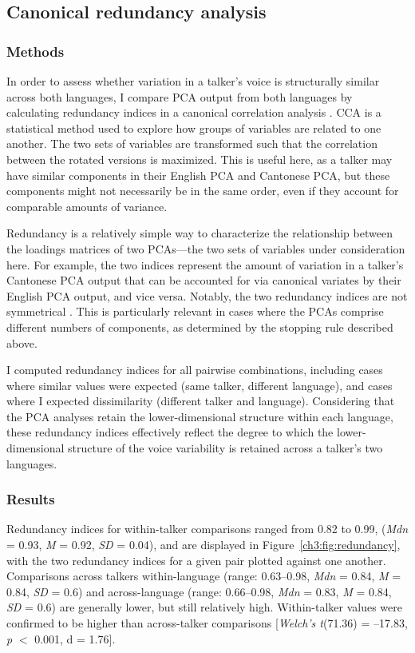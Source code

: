 \subsection{Canonical redundancy analysis}
\subsubsection{Methods}
In order to assess whether variation in a talker's voice is structurally similar across both languages, I compare PCA output from both languages by calculating redundancy indices in a canonical correlation analysis \citep[CCA][]{stewart_1968_canonical, jolliffe_2002_pca}.  CCA is a statistical method used to explore how groups of variables are related to one another. The two sets of variables are transformed such that the correlation between the rotated versions is maximized. This is useful here, as a talker may have similar components in their English PCA and Cantonese PCA, but these components might not necessarily be in the same order, even if they account for comparable amounts of variance.

Redundancy is a relatively simple way to characterize the relationship between the loadings matrices of two PCAs---the two sets of variables under consideration here. For example, the two indices represent the amount of variation in a talker's Cantonese PCA output that can be accounted for via canonical variates by their English PCA output, and vice versa. Notably, the two redundancy indices are not symmetrical \citep{stewart_1968_canonical}. This is particularly relevant in cases where the PCAs comprise different numbers of components, as determined by the stopping rule described above.

I computed redundancy indices for all pairwise combinations, including cases where similar values were expected (same talker, different language), and cases where I expected dissimilarity (different talker and language). Considering that the PCA analyses retain the lower-dimensional structure within each language, these redundancy indices effectively reflect the degree to which the lower-dimensional structure of the voice variability is retained across a talker's two languages.

\subsubsection{Results}


Redundancy indices for within-talker comparisons ranged from 0.82 to 0.99, (\textit{Mdn} = 0.93, \textit{M} = 0.92, \textit{SD} = 0.04), and are displayed in Figure~\ref{ch3:fig:redundancy}, with the two redundancy indices for a given pair plotted against one another. Comparisons across talkers within-language (range: 0.63--0.98, \textit{Mdn} = 0.84, \textit{M} = 0.84, \textit{SD} = 0.6) and across-language (range: 0.66--0.98, \textit{Mdn} = 0.83, \textit{M} = 0.84, \textit{SD} = 0.6) are generally lower, but still relatively high. Within-talker values were confirmed to be higher than across-talker comparisons [\textit{Welch's t}(71.36) = --17.83, \textit{p} $<$ 0.001, d = 1.76]. 

